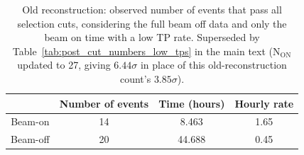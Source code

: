 \begin{table}[htbp]
\centering
{}
\caption{Old reconstruction: beam-on and beam-off events per hour for various selection cuts, comparing high TP and low TP rate periods. Superseded by Table~\ref{tab:onoff_ratio_high_low_tps} in the main text.}
\label{tab:onoff_ratio_high_low_tps_v1}
\end{table}

\begin{table}[htbp]
    \centering
    \begin{tabular}{|c|c|c|c|}
        \hline
         & Number of events & Time (hours) & Hourly rate\\
        \hline
        Beam-on & 14 & 8.463 & 1.65 \\
        \hline
        Beam-off & 20 & 44.688 & 0.45\\
        \hline
    \end{tabular}
    \caption{Old reconstruction: observed number of events that pass all selection cuts, considering the full beam off data and only the beam on time with a low TP rate. Superseded by Table~\ref{tab:post_cut_numbers_low_tps} in the main text ($\text{N}_{\text{ON}}$ updated to 27, giving $6.44\sigma$ in place of this old-reconstruction count's $3.85\sigma$).}
    \label{tab:post_cut_numbers_low_tps_v1}
\end{table}

